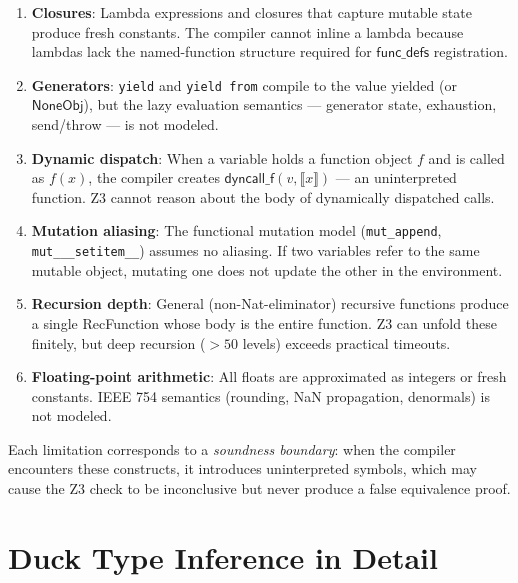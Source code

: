 \documentclass[11pt,a4paper]{report}
\theoremstyle{definition}
\theoremstyle{plain}
\newcommand{\den}[1]{\llbracket #1 \rrbracket}
\begin{document}
\begin{enumerate}
  \item \textbf{Closures}: Lambda expressions and closures that
    capture mutable state produce fresh constants.  The compiler
    cannot inline a lambda because lambdas lack the named-function
    structure required for $\mathsf{func\_defs}$ registration.

  \item \textbf{Generators}: \texttt{yield} and \texttt{yield from}
    compile to the value yielded (or $\mathsf{NoneObj}$), but the
    lazy evaluation semantics --- generator state, exhaustion,
    send/throw --- is not modeled.

  \item \textbf{Dynamic dispatch}: When a variable holds a function
    object $f$ and is called as $f(x)$, the compiler creates
    $\mathsf{dyncall\_f}(v, \den{x})$ --- an uninterpreted function.
    Z3 cannot reason about the body of dynamically dispatched calls.

  \item \textbf{Mutation aliasing}: The functional mutation model
    (\texttt{mut\_append}, \texttt{mut\_\_\_setitem\_\_}) assumes
    no aliasing.  If two variables refer to the same mutable object,
    mutating one does not update the other in the environment.

  \item \textbf{Recursion depth}: General (non-Nat-eliminator)
    recursive functions produce a single RecFunction whose body
    is the entire function.  Z3 can unfold these finitely, but
    deep recursion ($> 50$ levels) exceeds practical timeouts.

  \item \textbf{Floating-point arithmetic}: All floats are
    approximated as integers or fresh constants.  IEEE 754
    semantics (rounding, NaN propagation, denormals) is not modeled.
\end{enumerate}

Each limitation corresponds to a \emph{soundness boundary}: when the
compiler encounters these constructs, it introduces uninterpreted
symbols, which may cause the Z3 check to be inconclusive but never
produce a false equivalence proof.


\chapter{Duck Type Inference in Detail}
\label{ch:duck-detail}
\end{document}
